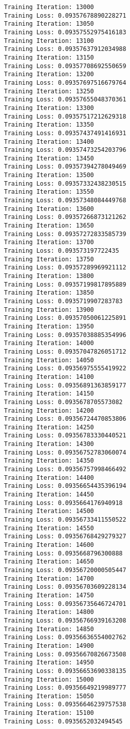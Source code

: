 \documentclass[11pt]{article}
\begin{document}
\begin{Verbatim}[commandchars=\\\{\}]
Training Iteration: 13000
Training Loss: 0.09357678890228271
Training Iteration: 13050
Training Loss: 0.09357552975416183
Training Iteration: 13100
Training Loss: 0.09357637912034988
Training Iteration: 13150
Training Loss: 0.09357708692550659
Training Iteration: 13200
Training Loss: 0.09357697516679764
Training Iteration: 13250
Training Loss: 0.09357655048370361
Training Iteration: 13300
Training Loss: 0.09357517212629318
Training Iteration: 13350
Training Loss: 0.09357437491416931
Training Iteration: 13400
Training Loss: 0.09357473254203796
Training Iteration: 13450
Training Loss: 0.09357394278049469
Training Iteration: 13500
Training Loss: 0.09357332438230515
Training Iteration: 13550
Training Loss: 0.09357348084449768
Training Iteration: 13600
Training Loss: 0.09357266873121262
Training Iteration: 13650
Training Loss: 0.09357272833585739
Training Iteration: 13700
Training Loss: 0.093573197722435
Training Iteration: 13750
Training Loss: 0.09357289969921112
Training Iteration: 13800
Training Loss: 0.09357199817895889
Training Iteration: 13850
Training Loss: 0.0935719907283783
Training Iteration: 13900
Training Loss: 0.09357050061225891
Training Iteration: 13950
Training Loss: 0.09357038885354996
Training Iteration: 14000
Training Loss: 0.09357047826051712
Training Iteration: 14050
Training Loss: 0.09356975555419922
Training Iteration: 14100
Training Loss: 0.09356891363859177
Training Iteration: 14150
Training Loss: 0.0935678705573082
Training Iteration: 14200
Training Loss: 0.09356724470853806
Training Iteration: 14250
Training Loss: 0.09356783330440521
Training Iteration: 14300
Training Loss: 0.09356752783060074
Training Iteration: 14350
Training Loss: 0.09356757998466492
Training Iteration: 14400
Training Loss: 0.09356654435396194
Training Iteration: 14450
Training Loss: 0.0935664176940918
Training Iteration: 14500
Training Loss: 0.09356733411550522
Training Iteration: 14550
Training Loss: 0.09356768429279327
Training Iteration: 14600
Training Loss: 0.0935668796300888
Training Iteration: 14650
Training Loss: 0.09356720000505447
Training Iteration: 14700
Training Loss: 0.09356703609228134
Training Iteration: 14750
Training Loss: 0.09356735646724701
Training Iteration: 14800
Training Loss: 0.09356766939163208
Training Iteration: 14850
Training Loss: 0.09356636554002762
Training Iteration: 14900
Training Loss: 0.09356670826673508
Training Iteration: 14950
Training Loss: 0.09356653690338135
Training Iteration: 15000
Training Loss: 0.09356649219989777
Training Iteration: 15050
Training Loss: 0.09356646239757538
Training Iteration: 15100
Training Loss: 0.0935652032494545

\end{Verbatim}
\end{document}

